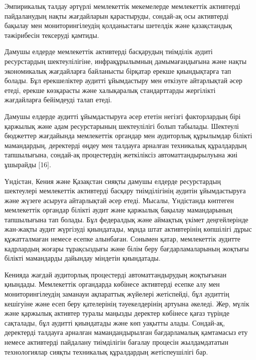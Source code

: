 \begin{multicols}{2}
Эмпирикалық талдау әртүрлі мемлекеттік мекемелерде мемлекеттік
активтерді пайдаланудың нақты жағдайларын қарастыруды, сондай-ақ осы
активтерді бақылау мен мониторингілеудің қолданыстағы шетелдік және
қазақстандық тәжірибесін тексеруді қамтиды.

Дамушы елдерде мемлекеттік активтерді басқарудың тиімділік аудиті
ресурстардың шектеулілігіне, инфрақұрылымның дамымағандығына және нақты
экономикалық жағдайларға байланысты бірқатар ерекше қиындықтарға тап
болады. Бұл ерекшеліктер аудитті ұйымдастыру мен өткізуге айтарлықтай
әсер етеді, ерекше көзқарасты және халықаралық стандарттарды жергілікті
жағдайларға бейімдеуді талап етеді.

Дамушы елдерде аудитті ұйымдастыруға әсер ететін негізгі факторлардың
бірі қаржылық және адам ресурстарының шектеулілігі болып табылады.
Шектеулі бюджеттер жағдайында мемлекеттік органдар мен аудиторлық
құрылымдар білікті мамандардың, деректерді өңдеу мен талдауға арналған
техникалық құралдардың тапшылығына, сондай-ақ процестердің жеткіліксіз
автоматтандырылуына жиі ұшырайды {[}16{]}.

Үндістан, Кения және Қазақстан сияқты дамушы елдерде ресурстардың
шектеулері мемлекеттік активтерді басқару тиімділігінің аудитін
ұйымдастыруға және жүзеге асыруға айтарлықтай әсер етеді. Мысалы,
Үндістанда көптеген мемлекеттік органдар білікті аудит және қаржылық
бақылау мамандарының тапшылығына тап болады. Бұл федералдық және
аймақтық үкімет деңгейлерінде жан-жақты аудит жүргізуді қиындатады,
мұнда штат активтерінің көпшілігі дұрыс құжатталмаған немесе есепке
алынбаған. Сонымен қатар, мемлекеттік аудитте кадрлардың жоғары
тұрақсыздығы және білім беру бағдарламаларының жоқтығы білікті
мамандарды дайындау міндетін қиындатады.

Кенияда жағдай аудиторлық процестерді автоматтандырудың жоқтығынан
қиындады. Мемлекеттік органдарда көбінесе активтерді есепке алу мен
мониторингілеудің заманауи ақпараттық жүйелері жетіспейді, бұл аудиттің
кешігуіне және есеп беру қателерінің тәуекелдерінің артуына әкеледі.
Жер, мүлік және қаржылық активтер туралы маңызды деректер көбінесе қағаз
түрінде сақталады, бұл аудитті қиындатады және көп уақытты алады.
Сондай-ақ, деректерді талдауға арналған мамандандырылған бағдарламалық
қамтамасыз ету немесе активтерді пайдалану тиімділігін бағалау процесін
жылдамдататын технологиялар сияқты техникалық құралдардың жетіспеушілігі
бар.


\end{multicols}
